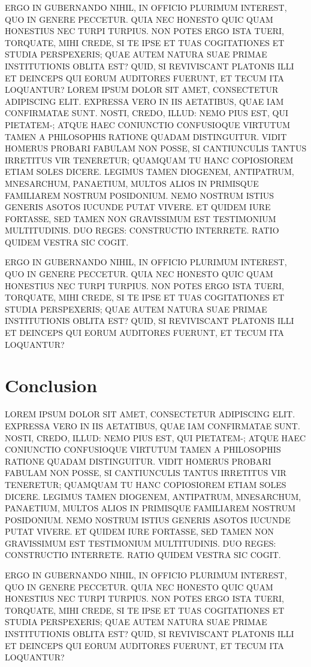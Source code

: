 \documentclass[letterpaper]{article}
\begin{document}
ERGO IN GUBERNANDO NIHIL, IN OFFICIO PLURIMUM INTEREST, QUO IN GENERE PECCETUR. QUIA NEC HONESTO QUIC QUAM HONESTIUS NEC TURPI TURPIUS. NON POTES ERGO ISTA TUERI, TORQUATE, MIHI CREDE, SI TE IPSE ET TUAS COGITATIONES ET STUDIA PERSPEXERIS; QUAE AUTEM NATURA SUAE PRIMAE INSTITUTIONIS OBLITA EST? QUID, SI REVIVISCANT PLATONIS ILLI ET DEINCEPS QUI EORUM AUDITORES FUERUNT, ET TECUM ITA LOQUANTUR?
LOREM IPSUM DOLOR SIT AMET, CONSECTETUR ADIPISCING ELIT. EXPRESSA VERO IN IIS AETATIBUS, QUAE IAM CONFIRMATAE SUNT. NOSTI, CREDO, ILLUD: NEMO PIUS EST, QUI PIETATEM-; ATQUE HAEC CONIUNCTIO CONFUSIOQUE VIRTUTUM TAMEN A PHILOSOPHIS RATIONE QUADAM DISTINGUITUR. VIDIT HOMERUS PROBARI FABULAM NON POSSE, SI CANTIUNCULIS TANTUS IRRETITUS VIR TENERETUR; QUAMQUAM TU HANC COPIOSIOREM ETIAM SOLES DICERE. LEGIMUS TAMEN DIOGENEM, ANTIPATRUM, MNESARCHUM, PANAETIUM, MULTOS ALIOS IN PRIMISQUE FAMILIAREM NOSTRUM POSIDONIUM. NEMO NOSTRUM ISTIUS GENERIS ASOTOS IUCUNDE PUTAT VIVERE. ET QUIDEM IURE FORTASSE, SED TAMEN NON GRAVISSIMUM EST TESTIMONIUM MULTITUDINIS. DUO REGES: CONSTRUCTIO INTERRETE. RATIO QUIDEM VESTRA SIC COGIT.

ERGO IN GUBERNANDO NIHIL, IN OFFICIO PLURIMUM INTEREST, QUO IN GENERE PECCETUR. QUIA NEC HONESTO QUIC QUAM HONESTIUS NEC TURPI TURPIUS. NON POTES ERGO ISTA TUERI, TORQUATE, MIHI CREDE, SI TE IPSE ET TUAS COGITATIONES ET STUDIA PERSPEXERIS; QUAE AUTEM NATURA SUAE PRIMAE INSTITUTIONIS OBLITA EST? QUID, SI REVIVISCANT PLATONIS ILLI ET DEINCEPS QUI EORUM AUDITORES FUERUNT, ET TECUM ITA LOQUANTUR?


\section{Conclusion}
LOREM IPSUM DOLOR SIT AMET, CONSECTETUR ADIPISCING ELIT. EXPRESSA VERO IN IIS AETATIBUS, QUAE IAM CONFIRMATAE SUNT. NOSTI, CREDO, ILLUD: NEMO PIUS EST, QUI PIETATEM-; ATQUE HAEC CONIUNCTIO CONFUSIOQUE VIRTUTUM TAMEN A PHILOSOPHIS RATIONE QUADAM DISTINGUITUR. VIDIT HOMERUS PROBARI FABULAM NON POSSE, SI CANTIUNCULIS TANTUS IRRETITUS VIR TENERETUR; QUAMQUAM TU HANC COPIOSIOREM ETIAM SOLES DICERE. LEGIMUS TAMEN DIOGENEM, ANTIPATRUM, MNESARCHUM, PANAETIUM, MULTOS ALIOS IN PRIMISQUE FAMILIAREM NOSTRUM POSIDONIUM. NEMO NOSTRUM ISTIUS GENERIS ASOTOS IUCUNDE PUTAT VIVERE. ET QUIDEM IURE FORTASSE, SED TAMEN NON GRAVISSIMUM EST TESTIMONIUM MULTITUDINIS. DUO REGES: CONSTRUCTIO INTERRETE. RATIO QUIDEM VESTRA SIC COGIT.

ERGO IN GUBERNANDO NIHIL, IN OFFICIO PLURIMUM INTEREST, QUO IN GENERE PECCETUR. QUIA NEC HONESTO QUIC QUAM HONESTIUS NEC TURPI TURPIUS. NON POTES ERGO ISTA TUERI, TORQUATE, MIHI CREDE, SI TE IPSE ET TUAS COGITATIONES ET STUDIA PERSPEXERIS; QUAE AUTEM NATURA SUAE PRIMAE INSTITUTIONIS OBLITA EST? QUID, SI REVIVISCANT PLATONIS ILLI ET DEINCEPS QUI EORUM AUDITORES FUERUNT, ET TECUM ITA LOQUANTUR?
\end{document}

